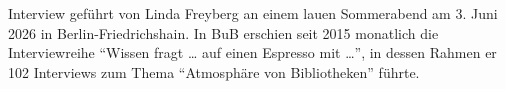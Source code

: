 Interview geführt von Linda Freyberg an einem lauen Sommerabend am 3.
Juni 2026 in Berlin-Friedrichshain. In BuB erschien seit 2015 monatlich
die Interviewreihe \enquote{Wissen fragt \ldots{} auf einen Espresso mit
\ldots{}}, in dessen Rahmen er 102 Interviews zum Thema \enquote{Atmosphäre
von Bibliotheken} führte.